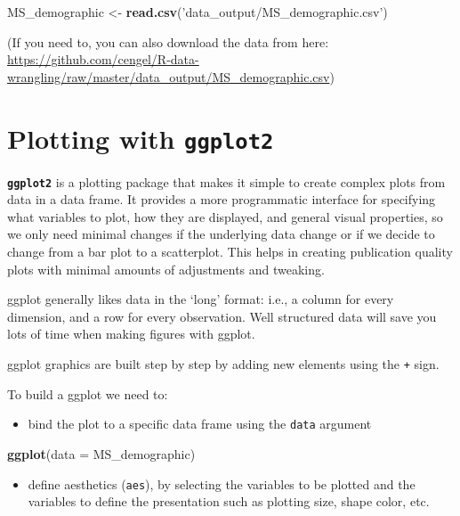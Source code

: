 \documentclass[]{book}
\newenvironment{Shaded}{\begin{snugshade}}{\end{snugshade}}
\newcommand{\KeywordTok}[1]{\textcolor[rgb]{0.13,0.29,0.53}{\textbf{#1}}}
\newcommand{\DataTypeTok}[1]{\textcolor[rgb]{0.13,0.29,0.53}{#1}}
\newcommand{\StringTok}[1]{\textcolor[rgb]{0.31,0.60,0.02}{#1}}
\newcommand{\NormalTok}[1]{#1}
\providecommand{\tightlist}{%
  \setlength{\itemsep}{0pt}\setlength{\parskip}{0pt}}
\theoremstyle{definition}
\theoremstyle{definition}
\theoremstyle{definition}
\theoremstyle{remark}
\begin{document}
\begin{Shaded}
\begin{Highlighting}[]
\NormalTok{MS_demographic <-}\StringTok{ }\KeywordTok{read.csv}\NormalTok{(}\StringTok{'data_output/MS_demographic.csv'}\NormalTok{)}
\end{Highlighting}
\end{Shaded}

(If you need to, you can also download the data from here:
\url{https://github.com/cengel/R-data-wrangling/raw/master/data_output/MS_demographic.csv})

\section{\texorpdfstring{Plotting with
\textbf{\texttt{ggplot2}}}{Plotting with ggplot2}}\label{plotting-with-ggplot2}

\textbf{\texttt{ggplot2}} is a plotting package that makes it simple to
create complex plots from data in a data frame. It provides a more
programmatic interface for specifying what variables to plot, how they
are displayed, and general visual properties, so we only need minimal
changes if the underlying data change or if we decide to change from a
bar plot to a scatterplot. This helps in creating publication quality
plots with minimal amounts of adjustments and tweaking.

ggplot generally likes data in the `long' format: i.e., a column for
every dimension, and a row for every observation. Well structured data
will save you lots of time when making figures with ggplot.

ggplot graphics are built step by step by adding new elements using the
\texttt{+} sign.

To build a ggplot we need to:

\begin{itemize}
\tightlist
\item
  bind the plot to a specific data frame using the \texttt{data}
  argument
\end{itemize}

\begin{Shaded}
\begin{Highlighting}[]
\KeywordTok{ggplot}\NormalTok{(}\DataTypeTok{data =}\NormalTok{ MS_demographic)}
\end{Highlighting}
\end{Shaded}

\begin{itemize}
\tightlist
\item
  define aesthetics (\texttt{aes}), by selecting the variables to be
  plotted and the variables to define the presentation such as plotting
  size, shape color, etc.
\end{itemize}
\end{document}
